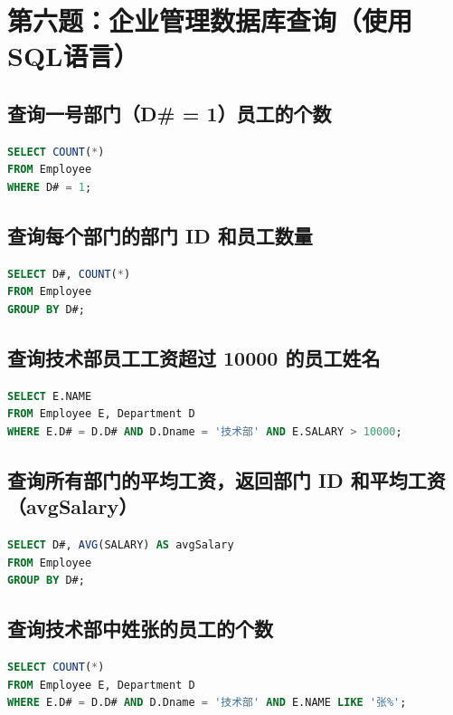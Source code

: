 \documentclass[11pt]{article} %
\begin{document}
\section{第六题：企业管理数据库查询（使用 SQL语言）}

\subsection{查询一号部门（D\# = 1）员工的个数}
\begin{lstlisting}[language=SQL]
SELECT COUNT(*)
FROM Employee
WHERE D# = 1;
\end{lstlisting}

\subsection{查询每个部门的部门 ID 和员工数量}
\begin{lstlisting}[language=SQL]
SELECT D#, COUNT(*)
FROM Employee
GROUP BY D#;
\end{lstlisting}

\subsection{查询技术部员工工资超过 10000 的员工姓名}
\begin{lstlisting}[language=SQL]
SELECT E.NAME
FROM Employee E, Department D
WHERE E.D# = D.D# AND D.Dname = '技术部' AND E.SALARY > 10000;
\end{lstlisting}

\subsection{查询所有部门的平均工资，返回部门 ID 和平均工资（avgSalary）}
\begin{lstlisting}[language=SQL]
SELECT D#, AVG(SALARY) AS avgSalary
FROM Employee
GROUP BY D#;
\end{lstlisting}

\subsection{查询技术部中姓张的员工的个数}
\begin{lstlisting}[language=SQL]
SELECT COUNT(*)
FROM Employee E, Department D
WHERE E.D# = D.D# AND D.Dname = '技术部' AND E.NAME LIKE '张%';
\end{lstlisting}
\end{document}
